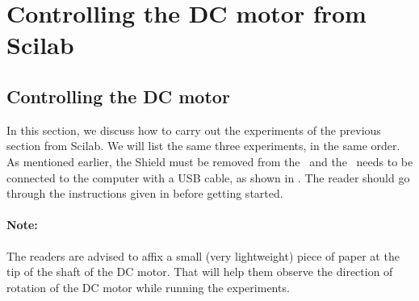 \section{Controlling the DC motor from Scilab}
\label{sec:dcm-sci}
\subsection{Controlling the DC motor}
In this section, we discuss how to carry out the experiments of the
previous section from Scilab. We will list the same three experiments,
in the same order.  As mentioned earlier, the Shield must be removed from 
the \arduino\ and the \arduino\ needs to be connected to the computer 
with a USB cable, as shown in . The reader should go through the instructions given in
 before getting started. 

\paragraph{Note:} The readers are advised to affix a small 
(very lightweight) piece of paper at the tip of the shaft of the DC motor. 
That will help them observe the direction of rotation 
of the DC motor while running the experiments. 

